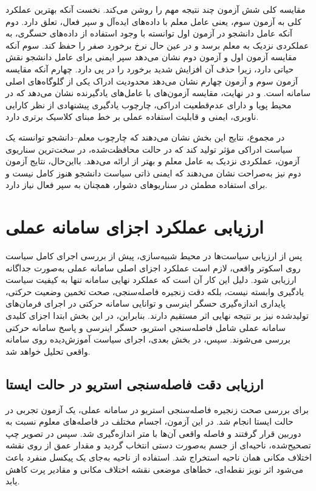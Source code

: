 مقایسه کلی شش آزمون چند نتیجه مهم را روشن می‌کند. نخست آنکه بهترین عملکرد کلی به آزمون سوم، یعنی عامل معلم با داده‌های ایده‌آل و سپر فعال، تعلق دارد. دوم آنکه عامل دانشجو در آزمون اول توانسته با وجود استفاده از داده‌های حسگری، به عملکردی نزدیک به معلم برسد و در عین حال نرخ برخورد صفر را حفظ کند. سوم آنکه مقایسه آزمون اول و آزمون دوم نشان می‌دهد سپر ایمنی برای عامل دانشجو نقش حیاتی دارد، زیرا حذف آن افزایش شدید برخورد را در پی دارد. چهارم آنکه مقایسه آزمون سوم و آزمون چهارم نشان می‌دهد محدودیت ادراک یکی از گلوگاه‌های اصلی سامانه است. و در نهایت، مقایسه آزمون‌های  با عامل‌های یادگیرنده نشان می‌دهد که در محیط پویا و دارای عدم‌قطعیت ادراکی، چارچوب یادگیری پیشنهادی از نظر کارایی ناوبری، ایمنی و قابلیت استفاده عملی بر خط مبنای کلاسیک  برتری دارد.

در مجموع، نتایج این بخش نشان می‌دهند که چارچوب معلم--دانشجو توانسته یک سیاست ادراکی مؤثر تولید کند که در حالت محافظت‌شده، در سخت‌ترین سناریوی آزمون، عملکردی نزدیک به عامل معلم و بهتر از  ارائه می‌دهد. بااین‌حال، نتایج آزمون دوم نیز به‌صراحت نشان می‌دهند که ایمنی ذاتی سیاست دانشجو هنوز کامل نیست و برای استفاده مطمئن در سناریوهای دشوار، همچنان به سپر فعال نیاز دارد.

\section{ارزیابی عملکرد اجزای سامانه عملی}
\label{sec:real_system_component_validation}

پس از ارزیابی سیاست‌ها در محیط شبیه‌سازی، پیش از بررسی اجرای کامل سیاست روی اسکوتر واقعی، لازم است عملکرد اجزای اصلی سامانه عملی به‌صورت جداگانه ارزیابی شود. دلیل این کار آن است که عملکرد نهایی سامانه تنها به کیفیت سیاست یادگیری وابسته نیست، بلکه دقت زنجیره فاصله‌سنجی، صحت تخمین وضعیت حرکتی، پایداری اندازه‌گیری حسگر اینرسی و توانایی سامانه حرکتی در اجرای فرمان‌های تولیدشده نیز بر نتیجه نهایی اثر مستقیم دارند. بنابراین، در این بخش ابتدا اجزای کلیدی سامانه عملی شامل فاصله‌سنجی استریو، حسگر اینرسی و پاسخ سامانه حرکتی بررسی می‌شوند. سپس، در بخش بعدی، اجرای سیاست آموزش‌دیده روی سامانه واقعی تحلیل خواهد شد.
\subsection{ارزیابی دقت فاصله‌سنجی استریو در حالت ایستا}
\label{subsec:stereo_depth_accuracy_test}

برای بررسی صحت زنجیره فاصله‌سنجی استریو در سامانه عملی، یک آزمون تجربی در حالت ایستا انجام شد. در این آزمون، اجسام مختلف در فاصله‌های معلوم نسبت به دوربین قرار گرفتند و فاصله واقعی آن‌ها با متر اندازه‌گیری شد. سپس در تصویر چپ تصحیح‌شده، ناحیه‌ای از جسم به‌صورت دستی انتخاب گردید و مقدار عمق از روی نقشه اختلاف مکانی همان ناحیه استخراج شد. استفاده از ناحیه به‌جای یک پیکسل منفرد باعث می‌شود اثر نویز نقطه‌ای، خطاهای موضعی نقشه اختلاف مکانی و مقادیر پرت کاهش یابد.

